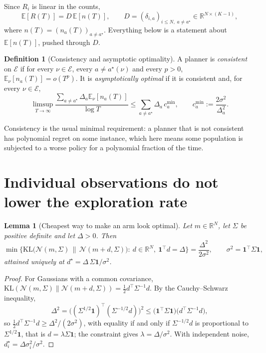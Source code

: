 \documentclass[11pt,a4paper]{article}
\theoremstyle{plain}
\newtheorem{lemma}[theorem]{Lemma}
\theoremstyle{definition}
\newtheorem{definition}[theorem]{Definition}
\theoremstyle{remark}
\newcommand{\E}{\mathbb{E}}
\newcommand{\R}{\mathbb{R}}
\newcommand{\KL}{\mathrm{KL}}
\newcommand{\cmin}{c^{\min}}
\newcommand{\astar}{a^\star}
\newcommand{\Env}{\mathcal{E}}
\begin{document}
Since $R_i$ is linear in the counts,
\begin{equation}\label{eq:linear}
  \E[R(T)]=D\,\E[n(T)],\qquad D=(\delta_{i,a})_{i\le N,\;a\neq\astar}\in\R^{N\times(K-1)},
\end{equation}
where $n(T)=(n_a(T))_{a\neq\astar}$. Everything below is a statement about $\E[n(T)]$, pushed through $D$.

\begin{definition}[Consistency and asymptotic optimality]\label{def:consistent}
A planner is \emph{consistent} on $\Env$ if for every $\nu\in\Env$, every $a\neq\astar(\nu)$ and every $p>0$, $\E_\nu[n_a(T)]=o(T^p)$. It is \emph{asymptotically optimal} if it is consistent and, for every $\nu\in\Env$,
\[
  \limsup_{T\to\infty}\frac{\sum_{a\neq\astar}\Delta_a\E_\nu[n_a(T)]}{\log T}\le\sum_{a\neq\astar}\Delta_a\,\cmin_a,\qquad \cmin_a:=\frac{2\sigma^2}{\Delta_a^2}.
\]
\end{definition}

Consistency is the usual minimal requirement: a planner that is not consistent has polynomial regret on some instance, which here means some population is subjected to a worse policy for a polynomial fraction of the time.

\section{Individual observations do not lower the exploration rate}\label{sec:lower}

\begin{lemma}[Cheapest way to make an arm look optimal]\label{lem:kl}
Let $m\in\R^N$, let $\Sigma$ be positive definite and let $\Delta>0$. Then
\[
  \min\Big\{\KL\big(\mathcal N(m,\Sigma)\,\|\,\mathcal N(m+d,\Sigma)\big):\ d\in\R^N,\ \mathbf 1^\top d=\Delta\Big\}=\frac{\Delta^2}{2\sigma^2},\qquad \sigma^2=\mathbf 1^\top\Sigma\mathbf 1,
\]
attained uniquely at $d^\star=\Delta\,\Sigma\mathbf 1/\sigma^2$.
\end{lemma}

\begin{proof}
For Gaussians with a common covariance, $\KL(\mathcal N(m,\Sigma)\|\mathcal N(m+d,\Sigma))=\tfrac12d^\top\Sigma^{-1}d$. By the Cauchy--Schwarz inequality,
\[
  \Delta^2=\big((\Sigma^{1/2}\mathbf 1)^\top(\Sigma^{-1/2}d)\big)^2\le\big(\mathbf 1^\top\Sigma\mathbf 1\big)\big(d^\top\Sigma^{-1}d\big),
\]
so $\tfrac12d^\top\Sigma^{-1}d\ge\Delta^2/(2\sigma^2)$, with equality if and only if $\Sigma^{-1/2}d$ is proportional to $\Sigma^{1/2}\mathbf 1$, that is $d=\lambda\Sigma\mathbf 1$; the constraint gives $\lambda=\Delta/\sigma^2$. With independent noise, $d^\star_i=\Delta\sigma_i^2/\sigma^2$.
\end{proof}
\end{document}
